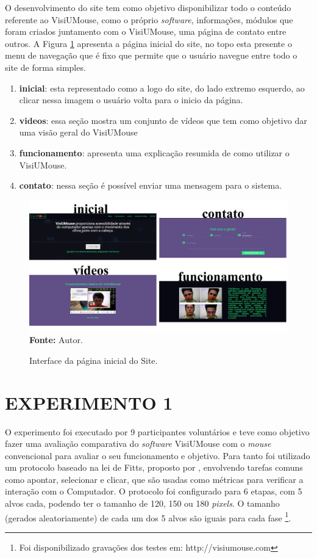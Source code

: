 O desenvolvimento do site tem como objetivo disponibilizar todo o conteúdo referente ao VisiUMouse, como o próprio \textit{software}, informações, módulos que foram criados juntamento com o VisiUMouse, uma página de contato entre outros. A Figura \ref{fig:site} apresenta a página inicial do site, no topo esta presente o menu de navegação que é fixo que permite que o usuário navegue entre todo o site de forma simples.

\begin{enumerate}
\item \textbf{inicial}: esta representado como a logo do site, do lado extremo esquerdo, ao clicar nessa imagem o usuário volta para o inicio da página.
\item \textbf{videos}: essa seção mostra um conjunto de vídeos que tem como objetivo dar uma visão geral do VisiUMouse
\item \textbf{funcionamento}: apresenta uma explicação resumida de como utilizar o VisiUMouse.
\item \textbf{contato}: nessa seção é possível enviar uma mensagem para o sistema.
\end{enumerate}


\begin{figure}[htbp]
\caption{Interface da página inicial do Site.} 
\centering \includegraphics[scale=.165]{img/site.png}
\textbf{Fonte:} Autor.
\label{fig:site}
\end{figure}

\chapter{EXPERIMENTO 1}\label{CAP7}
O experimento foi executado por 9 participantes voluntários e teve como objetivo fazer uma avaliação comparativa do \textit{software} VisiUMouse com o \textit{mouse} convencional para avaliar o seu funcionamento e objetivo. Para tanto foi utilizado um protocolo baseado na lei de Fitts, proposto por , envolvendo tarefas comuns como apontar, selecionar e clicar, que são usadas como métricas para verificar a interação com o Computador. O protocolo foi configurado para 6 etapas, com 5 alvos cada, podendo ter o tamanho de 120, 150 ou 180 \textit{pixels}. O tamanho (gerados aleatoriamente) de cada um dos 5 alvos são iguais para cada fase \footnote{Foi disponibilizado gravações dos testes em: http://visiumouse.com}.

